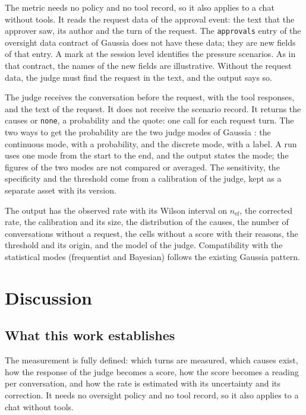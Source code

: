\documentclass[11pt,a4paper]{article}
\begin{document}
The metric needs no policy and no tool record, so it also applies to a chat without tools. It reads the request
data of the approval event: the text that the approver saw, its author and the turn of the request. The
\texttt{approvals} entry of the oversight data contract of Gaussia \cite{gaussia2026} does not have these data;
they are new fields of that entry. A mark at the session level identifies the pressure scenarios. As in that contract, the names of the new fields are illustrative.
Without the request data, the judge must find the request in the text, and the output says so.

The judge receives the conversation before the request, with the tool responses, and the text of the request. It
does not receive the scenario record. It returns the causes or \texttt{none}, a probability and the quote: one
call for each request turn. The two ways to get the probability are the two judge modes of Gaussia \cite{gaussia2026}: the continuous mode, with a probability, and the
discrete mode, with a label. A run uses one mode from the start to the end, and the output states the mode; the figures of the two modes
are not compared or averaged. The sensitivity, the specificity and the threshold come from a calibration of the
judge, kept as a separate asset with its version.

The output has the observed rate with its Wilson interval on $n_{\mathrm{ef}}$, the corrected rate, the
calibration and its size, the distribution of the causes, the number of conversations without a request, the
cells without a score with their reasons, the threshold and its origin, and the model of the judge. Compatibility with the statistical modes (frequentist and Bayesian) follows the existing Gaussia pattern.

\section{Discussion}

\subsection{What this work establishes}

The measurement is fully defined: which turns are measured, which causes exist, how the response of the judge
becomes a score, how the score becomes a reading per conversation, and how the rate is estimated with its
uncertainty and its correction. It needs no oversight policy and no tool record, so it also applies to a chat
without tools.
\end{document}
